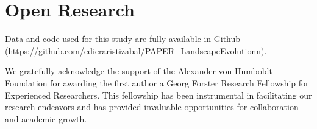 \documentclass[draft]{agujournal2019}
\begin{document}
\section{Open Research}
Data and code used for this study are fully available in Github (\url{https://github.com/edieraristizabal/PAPER_LandscapeEvolutionn}).

\acknowledgments
We gratefully acknowledge the support of the Alexander von Humboldt Foundation for awarding the first author a Georg Forster Research Fellowship for Experienced Researchers. This fellowship has been instrumental in facilitating our research endeavors and has provided invaluable opportunities for collaboration and academic growth.


\end{document}
